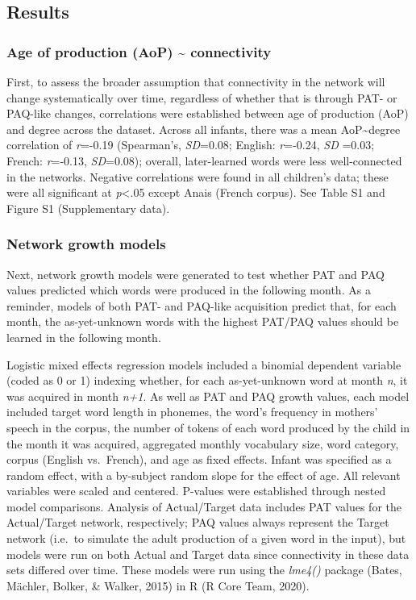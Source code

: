 \documentclass[
  man]{apa6}
\begin{document}
\hypertarget{results}{%
\subsection{Results}\label{results}}

\hypertarget{age-of-production-aop-connectivity}{%
\subsubsection{Age of production (AoP) \textasciitilde{} connectivity}\label{age-of-production-aop-connectivity}}

First, to assess the broader assumption that connectivity in the network will change systematically over time, regardless of whether that is through PAT- or PAQ-like changes, correlations were established between age of production (AoP) and degree across the dataset. Across all infants, there was a mean AoP\textasciitilde degree correlation of \emph{r}=-0.19 (Spearman's, \emph{SD}=0.08; English: \emph{r}=-0.24, \emph{SD} =0.03; French: \emph{r}=-0.13, \emph{SD}=0.08); overall, later-learned words were less well-connected in the networks. Negative correlations were found in all children's data; these were all significant at \emph{p}\textless.05 except Anais (French corpus). See Table S1 and Figure S1 (Supplementary data).

\hypertarget{network-growth-models-1}{%
\subsubsection{Network growth models}\label{network-growth-models-1}}

Next, network growth models were generated to test whether PAT and PAQ values predicted which words were produced in the following month. As a reminder, models of both PAT- and PAQ-like acquisition predict that, for each month, the as-yet-unknown words with the highest PAT/PAQ values should be learned in the following month.

Logistic mixed effects regression models included a binomial dependent variable (coded as 0 or 1) indexing whether, for each as-yet-unknown word at month \emph{n}, it was acquired in month \emph{n+1}. As well as PAT and PAQ growth values, each model included target word length in phonemes, the word's frequency in mothers' speech in the corpus, the number of tokens of each word produced by the child in the month it was acquired, aggregated monthly vocabulary size, word category, corpus (English vs.~French), and age as fixed effects. Infant was specified as a random effect, with a by-subject random slope for the effect of age. All relevant variables were scaled and centered. P-values were established through nested model comparisons. Analysis of Actual/Target data includes PAT values for the Actual/Target network, respectively; PAQ values always represent the Target network (i.e.~to simulate the adult production of a given word in the input), but models were run on both Actual and Target data since connectivity in these data sets differed over time. These models were run using the \emph{lme4()} package (Bates, Mächler, Bolker, \& Walker, 2015) in R (R Core Team, 2020).
\end{document}
